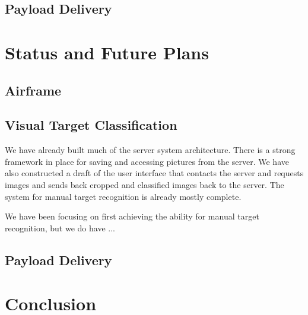 \documentclass[]{auvsi_doc}
\begin{document}
\subsection{Payload Delivery}
\section{Status and Future Plans}
\subsection{Airframe}
\subsection{Visual Target Classification}
We have already built much of the server system architecture. There is a strong framework in place for saving and accessing pictures
from the server. We have also constructed a draft of the user interface that contacts the server and requests images and sends back
cropped and classified images back to the server. The system for manual target recognition is already mostly complete.

We have been focusing on first achieving the ability for manual target recognition, but we do have ...
\subsection{Payload Delivery}
\section{Conclusion}

\end{document}
